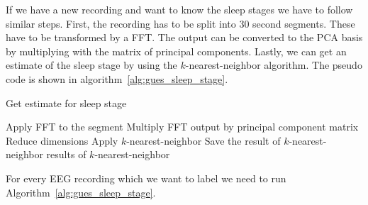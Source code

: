 \newpage
If we have a new recording and want to know the sleep stages we have to follow similar steps. First, the recording has to be split into 30 second segments. These have to be transformed by a FFT. The output can be converted to the PCA basis by multiplying with the matrix of principal components. Lastly, we can get an estimate of the sleep stage by using the $k$-nearest-neighbor algorithm. The pseudo code is shown in algorithm~\ref{alg:gues_sleep_stage}.

\begin{algorithm}[h]
	\caption{Get estimate for sleep stage}\label{alg:gues_sleep_stage}
	\begin{algorithmic}
			\State Apply FFT to the segment
			\State Multiply FFT output by principal component matrix
			\State Reduce dimensions
			\State Apply $k$-nearest-neighbor
			\State Save the result of $k$-nearest-neighbor
		\EndFor
		\State \Return results of $k$-nearest-neighbor
	\end{algorithmic}
\end{algorithm}

For every EEG recording which we want to label we need to run Algorithm~\ref{alg:gues_sleep_stage}.
